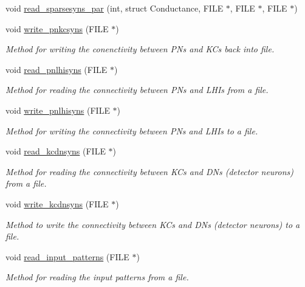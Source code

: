 \begin{DoxyCompactItemize}
void \hyperlink{classclassol_a8f2e2c575501aa0bb2c5864adccd6aac}{read\+\_\+sparsesyns\+\_\+par} (int, struct Conductance, F\+I\+L\+E $\ast$, F\+I\+L\+E $\ast$, F\+I\+L\+E $\ast$)
\item 
void \hyperlink{classclassol_a272983bc77c8c547310a38fd340c29e4}{write\+\_\+pnkcsyns} (F\+I\+L\+E $\ast$)
\begin{DoxyCompactList}\small\item\em Method for writing the conenctivity between P\+Ns and K\+Cs back into file. \end{DoxyCompactList}\item 
void \hyperlink{classclassol_a135ee4ab60d3afa11c5cba74d362fbe6}{read\+\_\+pnlhisyns} (F\+I\+L\+E $\ast$)
\begin{DoxyCompactList}\small\item\em Method for reading the connectivity between P\+Ns and L\+H\+Is from a file. \end{DoxyCompactList}\item 
void \hyperlink{classclassol_a661def594f59444eac7a0a08e599ec07}{write\+\_\+pnlhisyns} (F\+I\+L\+E $\ast$)
\begin{DoxyCompactList}\small\item\em Method for writing the connectivity between P\+Ns and L\+H\+Is to a file. \end{DoxyCompactList}\item 
void \hyperlink{classclassol_a5530acb74e884fe7b802e2e6eaec9c3a}{read\+\_\+kcdnsyns} (F\+I\+L\+E $\ast$)
\begin{DoxyCompactList}\small\item\em Method for reading the connectivity between K\+Cs and D\+Ns (detector neurons) from a file. \end{DoxyCompactList}\item 
void \hyperlink{classclassol_ad409b77aceb2136bbc069b1ec55d7998}{write\+\_\+kcdnsyns} (F\+I\+L\+E $\ast$)
\begin{DoxyCompactList}\small\item\em Method to write the connectivity between K\+Cs and D\+Ns (detector neurons) to a file. \end{DoxyCompactList}\item 
void \hyperlink{classclassol_a554e027fafa47fbf9ee68e9e5bd91de2}{read\+\_\+input\+\_\+patterns} (F\+I\+L\+E $\ast$)
\begin{DoxyCompactList}\small\item\em Method for reading the input patterns from a file. \end{DoxyCompactList}\item 

\end{DoxyCompactItemize}

